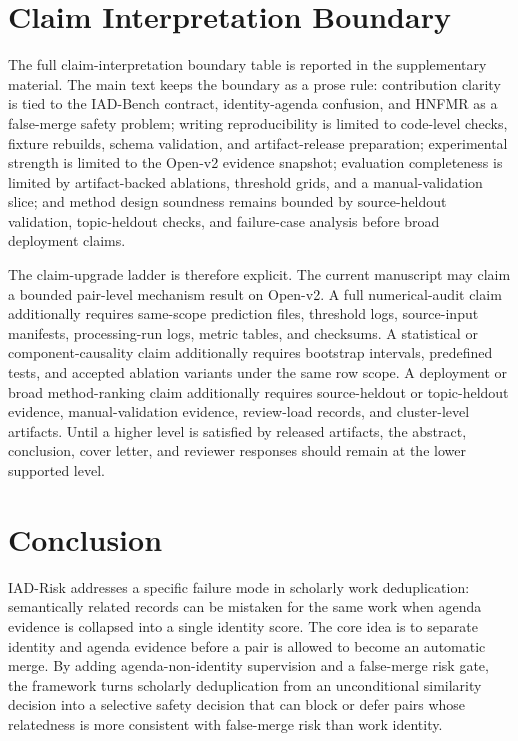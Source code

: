 \documentclass[preprint,12pt]{elsarticle}
\begin{document}
\section{Claim Interpretation Boundary}

The full claim-interpretation boundary table is reported in the supplementary material. The main text keeps the boundary as a prose rule: contribution clarity is tied to the IAD-Bench contract, identity-agenda confusion, and HNFMR as a false-merge safety problem; writing reproducibility is limited to code-level checks, fixture rebuilds, schema validation, and artifact-release preparation; experimental strength is limited to the Open-v2 evidence snapshot; evaluation completeness is limited by artifact-backed ablations, threshold grids, and a manual-validation slice; and method design soundness remains bounded by source-heldout validation, topic-heldout checks, and failure-case analysis before broad deployment claims.

The claim-upgrade ladder is therefore explicit. The current manuscript may claim a bounded pair-level mechanism result on Open-v2. A full numerical-audit claim additionally requires same-scope prediction files, threshold logs, source-input manifests, processing-run logs, metric tables, and checksums. A statistical or component-causality claim additionally requires bootstrap intervals, predefined tests, and accepted ablation variants under the same row scope. A deployment or broad method-ranking claim additionally requires source-heldout or topic-heldout evidence, manual-validation evidence, review-load records, and cluster-level artifacts. Until a higher level is satisfied by released artifacts, the abstract, conclusion, cover letter, and reviewer responses should remain at the lower supported level.

\section{Conclusion}

IAD-Risk addresses a specific failure mode in scholarly work deduplication: semantically related records can be mistaken for the same work when agenda evidence is collapsed into a single identity score. The core idea is to separate identity and agenda evidence before a pair is allowed to become an automatic merge. By adding agenda-non-identity supervision and a false-merge risk gate, the framework turns scholarly deduplication from an unconditional similarity decision into a selective safety decision that can block or defer pairs whose relatedness is more consistent with false-merge risk than work identity.
\end{document}
